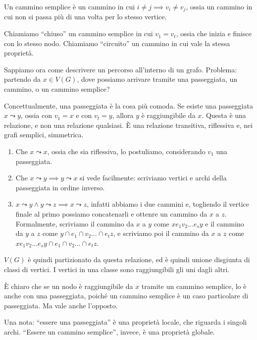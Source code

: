 \begin{defn}
	Un cammino semplice \`e un cammino in cui $i \neq j \implies v_i \neq v_j$, ossia un cammino in cui non si passa pi\`u di una volta per lo stesso vertice.
\end{defn}

Chiamiamo ``chiuso'' un cammino semplice in cui $v_1 = v_t$, ossia che inizia e finisce con lo stesso nodo.
Chiamiamo ``circuito'' un cammino in cui vale la stessa propriet\`a.

Sappiamo ora come descrivere un percorso all'interno di un grafo.
Problema: partendo da $x \in V(G)$, dove possiamo arrivare tramite una passeggiata, un cammino, o un cammino semplice?

Concettualmente, una passeggiata \`e la cosa pi\`u comoda.
Se esiste una passeggiata $x \leadsto y$, ossia con $v_1 = x$ e con $v_t = y$, allora $y$ \`e raggiungibile da $x$.
Questa \`e una relazione, e non una relazione qualsiasi.
\`E una relazione transitiva, riflessiva e, nei grafi semplici, simmetrica.
\begin{enumerate}
	\item Che $x \leadsto x$, ossia che sia riflessiva, lo postuliamo, considerando $v_1$ una passeggiata.
	\item Che $x \leadsto y \implies y \leadsto x$ si vede facilmente: scriviamo vertici e archi della passeggiata in ordine inverso.
	\item $x \leadsto y \land y \leadsto z \implies x \leadsto z$, infatti abbiamo i due cammini e, togliendo il vertice finale al primo possiamo concatenarli e ottenre un cammino da $x$ a $z$.
	Formalmente, scriviamo il cammino da $x$ a $y$ come $x e_1 v_2 \dots e_s y$ e il cammino da $y$ a $z$ come $y \cap{e}_1 \cap{v}_2 \dots \cap{e}_t z$, e scriviamo poi il cammino da $x$ a $z$ come $x e_1 v_2 \dots e_s y \cap{e}_1 \cap{v}_2 \dots \cap{e}_t z$.
\end{enumerate}

$V(G)$ \`e quindi partizionato da questa relazione, ed \`e quindi unione disgiunta di classi di vertici.
I vertici in una classe sono raggiungibili gli uni dagli altri.

\`E chiaro che se un nodo \`e raggiungibile da $x$ tramite un cammino semplice, lo \`e anche con una passeggiata, poich\'e un cammino semplice \`e un caso particolare di passeggiata.
Ma vale anche l'opposto.

Una nota: ``essere una passeggiata'' \`e una propriet\`a locale, che riguarda i singoli archi.
``Essere un cammino semplice'', invece, \`e una propriet\`a globale.

